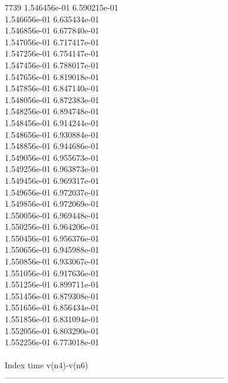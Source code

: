 7739	1.546456e-01	6.590215e-01	\\ 	1.546656e-01	6.635434e-01	\\ 	1.546856e-01	6.677840e-01	\\ 	1.547056e-01	6.717417e-01	\\ 	1.547256e-01	6.754147e-01	\\ 	1.547456e-01	6.788017e-01	\\ 	1.547656e-01	6.819018e-01	\\ 	1.547856e-01	6.847140e-01	\\ 	1.548056e-01	6.872383e-01	\\ 	1.548256e-01	6.894748e-01	\\ 	1.548456e-01	6.914244e-01	\\ 	1.548656e-01	6.930884e-01	\\ 	1.548856e-01	6.944686e-01	\\ 	1.549056e-01	6.955673e-01	\\ 	1.549256e-01	6.963873e-01	\\ 	1.549456e-01	6.969317e-01	\\ 	1.549656e-01	6.972037e-01	\\ 	1.549856e-01	6.972069e-01	\\ 	1.550056e-01	6.969448e-01	\\ 	1.550256e-01	6.964206e-01	\\ 	1.550456e-01	6.956376e-01	\\ 	1.550656e-01	6.945988e-01	\\ 	1.550856e-01	6.933067e-01	\\ 	1.551056e-01	6.917636e-01	\\ 	1.551256e-01	6.899711e-01	\\ 	1.551456e-01	6.879308e-01	\\ 	1.551656e-01	6.856434e-01	\\ 	1.551856e-01	6.831094e-01	\\ 	1.552056e-01	6.803290e-01	\\ 	1.552256e-01	6.773018e-01	\\ \hline
\\ \hline
Index   time            v(n4)-v(n6)     \\ \hline
--------------------------------------------------------------------------------\\ \hline
